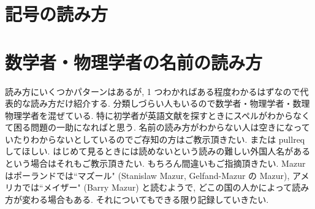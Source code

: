 \documentclass[openany, a4paper, oneside]{jsbook}
\begin{document}
\twocolumn
\chapter{記号の読み方}

\chapter{数学者・物理学者の名前の読み方}

読み方にいくつかパターンはあるが, 1 つわかればある程度わかるはずなので代表的な読み方だけ紹介する.
分類しづらい人もいるので数学者・物理学者・数理物理学者を混ぜている.
特に初学者が英語文献を探すときにスペルがわからなくて困る問題の一助になればと思う.
名前の読み方がわからない人は空きになっていたりわからないとしているのでご存知の方はご教示頂きたい.
または pullreq してほしい.
はじめて見るときには読めないという読みの難しい外国人名があるという場合はそれもご教示頂きたい.
もちろん間違いもご指摘頂きたい.
Mazur はポーランドでは``マズール" (Stanislaw Mazur, Gelfand-Mazur の Mazur),
アメリカでは``メイザー" (Barry Mazur) と読むようで, どこの国の人かによって読み方が変わる場合もある.
それについてもできる限り記録していきたい.
\end{document}
